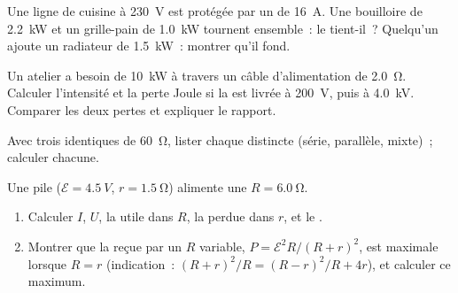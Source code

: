 \begin{exercise}[$\star\star$]\label{exo:g11:circuits-and-power:10}
Une ligne de cuisine à \qty{230}{V} est protégée par un
 de \qty{16}{A}. Une bouilloire de
\qty{2.2}{kW} et un grille-pain de \qty{1.0}{kW} tournent ensemble~: le
 tient-il~? Quelqu'un ajoute un radiateur
de \qty{1.5}{kW}~: montrer qu'il fond.
\end{exercise}

\begin{exercise}[$\star\star$]\label{exo:g11:circuits-and-power:11}
Un atelier a besoin de \qty{10}{kW} à travers un câble d'alimentation
de  \qty{2.0}{\ohm}. Calculer
l'intensité et la perte Joule si la
 est livrée à \qty{200}{V}, puis à
\qty{4.0}{kV}. Comparer les deux pertes et expliquer le rapport.
\end{exercise}

\begin{exercise}[$\star\star\star$]\label{exo:g11:circuits-and-power:12}
Avec trois  identiques de \qty{60}{\ohm}, lister chaque
 distincte (série,
parallèle, mixte)~; calculer chacune.
\end{exercise}

\begin{exercise}[$\star\star\star$]\label{exo:g11:circuits-and-power:13}
Une pile ($\mathcal{E} = \qty{4.5}{V}$, $r = \qty{1.5}{\ohm}$) alimente
une  $R = \qty{6.0}{\ohm}$.
\begin{enumerate}
  \item Calculer $I$, $U$, la  utile dans
        $R$, la  perdue dans $r$, et le
        .
  \item Montrer que la  reçue par un
        $R$ variable, $P = \mathcal{E}^2 R/(R+r)^2$, est maximale lorsque
        $R = r$ (indication~: $(R+r)^2/R = (R-r)^2/R + 4r$), et
        calculer ce maximum.
\end{enumerate}
\end{exercise}

